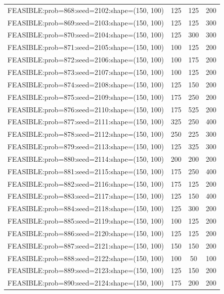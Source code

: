 \begin{longtable}{lccc}
FEASIBLE:prob=868:seed=2102:shape=(150, 100) &      125 &   125 &    200 \\
FEASIBLE:prob=869:seed=2103:shape=(150, 100) &      125 &   125 &    300 \\
FEASIBLE:prob=870:seed=2104:shape=(150, 100) &      125 &   300 &    300 \\
FEASIBLE:prob=871:seed=2105:shape=(150, 100) &      100 &   125 &    200 \\
FEASIBLE:prob=872:seed=2106:shape=(150, 100) &      100 &   175 &    200 \\
FEASIBLE:prob=873:seed=2107:shape=(150, 100) &      100 &   125 &    200 \\
FEASIBLE:prob=874:seed=2108:shape=(150, 100) &      125 &   150 &    200 \\
FEASIBLE:prob=875:seed=2109:shape=(150, 100) &      175 &   250 &    200 \\
FEASIBLE:prob=876:seed=2110:shape=(150, 100) &      175 &   525 &    200 \\
FEASIBLE:prob=877:seed=2111:shape=(150, 100) &      325 &   250 &    400 \\
FEASIBLE:prob=878:seed=2112:shape=(150, 100) &      250 &   225 &    300 \\
FEASIBLE:prob=879:seed=2113:shape=(150, 100) &      125 &   325 &    300 \\
FEASIBLE:prob=880:seed=2114:shape=(150, 100) &      200 &   200 &    200 \\
FEASIBLE:prob=881:seed=2115:shape=(150, 100) &      175 &   250 &    400 \\
FEASIBLE:prob=882:seed=2116:shape=(150, 100) &      175 &   125 &    200 \\
FEASIBLE:prob=883:seed=2117:shape=(150, 100) &      125 &   150 &    400 \\
FEASIBLE:prob=884:seed=2118:shape=(150, 100) &      125 &   300 &    200 \\
FEASIBLE:prob=885:seed=2119:shape=(150, 100) &      100 &   125 &    200 \\
FEASIBLE:prob=886:seed=2120:shape=(150, 100) &      125 &   125 &    200 \\
FEASIBLE:prob=887:seed=2121:shape=(150, 100) &      150 &   150 &    200 \\
FEASIBLE:prob=888:seed=2122:shape=(150, 100) &      100 &    50 &    100 \\
FEASIBLE:prob=889:seed=2123:shape=(150, 100) &      125 &   150 &    200 \\
FEASIBLE:prob=890:seed=2124:shape=(150, 100) &      175 &   200 &    200 \\

\end{longtable}
